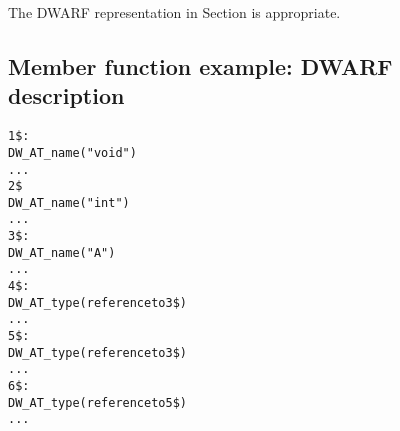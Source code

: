 The DWARF representation in 
Section 
is appropriate.

\subsection{Member function example: DWARF description}
\label{app:memberfunctionexampledwarfdescription}


\begin{alltt}
1\$: 
        DW\_AT\_name("void")
                ...
2\$ 
        DW\_AT\_name("int")
        ...
3\$: 
        DW\_AT\_name("A")
        ...
4\$:    
            DW\_AT\_type(reference to 3\$)
            ...
5\$:    
            DW\_AT\_type(reference to 3\$)
            ...
6\$:    
            DW\_AT\_type(reference to 5\$)
            ...


\end{alltt}
